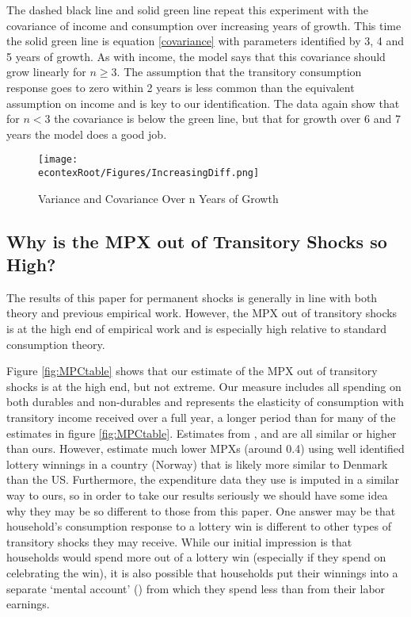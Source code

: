 \documentclass[titlepage]{\econtex}\newcommand{\texname}{IncomeUncertainty}
\begin{document}
The dashed black line and solid green line repeat this experiment with the covariance of income and consumption over increasing years of growth. This time the solid green line is equation \ref{covariance} with parameters identified by 3, 4 and 5 years of growth. As with income, the model says that this covariance should grow linearly for $n \geq 3$. The assumption that the transitory consumption response goes to zero within 2 years is less common than the equivalent assumption on income and is key to our identification. The data again show that for $n < 3$ the covariance is below the green line, but that for growth over 6 and 7 years the model does a good job.
\begin{figure} 
	\begin{centering}
		\texttt{[image: \\econtexRoot/Figures/IncreasingDiff.png]}
		\caption{Variance and Covariance Over n Years of Growth}
		\label{fig:IncreasingDiff}
	\end{centering}
\end{figure}

\subsection{Why is the MPX out of Transitory Shocks so High?} \label{whysohigh}
The results of this paper for permanent shocks is generally in line with both theory and previous empirical work. However, the MPX out of transitory shocks is at the high end of empirical work and is especially high relative to standard consumption theory.

Figure \ref{fig:MPCtable} shows that our estimate of the MPX out of transitory shocks is at the high end, but not extreme. Our measure includes all spending on both durables and non-durables and represents the elasticity of consumption with transitory income received over a full year, a longer period than for many of the estimates in figure \ref{fig:MPCtable}. Estimates from \cite{agarwal_consumption_2014}, \cite{parker_consumer_2013} and \cite{souleles_response_1999} are all similar or higher than ours. However, \cite{fagereng_mpc_2016} estimate much lower MPXs (around 0.4) using well identified lottery winnings in a country (Norway) that is likely more similar to Denmark than the US. Furthermore, the expenditure data they use is imputed in a similar way to ours, so in order to take our results seriously we should have some idea why they may be so different to those from this paper. One answer may be that household's consumption response to a lottery win is different to other types of transitory shocks they may receive. While our initial impression is that households would spend more out of a lottery win (especially if they spend on celebrating the win), it is also possible that households put their winnings into a separate `mental account' (\cite{thaler_mental_1985}) from which they spend less than from their labor earnings. 
\end{document}
